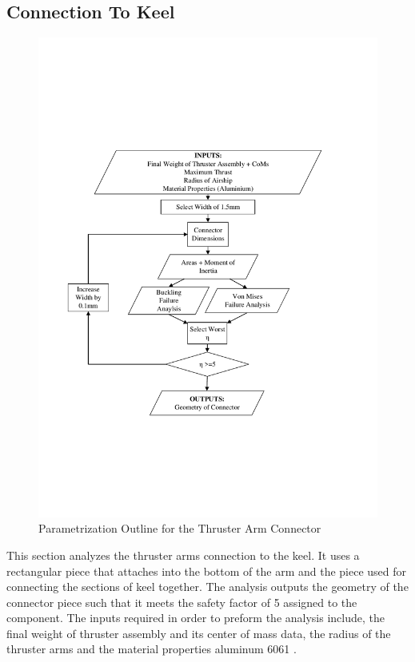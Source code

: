 \documentclass[../main.tex]{subfiles}
\begin{document}
\subsection{Connection To Keel} \label{connector}
\begin{figure}[H]
	\centering
	\includegraphics[width=.9\linewidth]{img/paramaterization/connector.pdf}
	\caption{Parametrization Outline for the Thruster Arm Connector}
	\label{fig:connectorParametrization}
\end{figure}

This section analyzes the thruster arms connection to the keel. It uses a rectangular piece that attaches into the bottom of the arm and the piece used for connecting the sections of keel together. The analysis outputs the geometry of the connector piece such that it meets the safety factor of 5 assigned to the component. The inputs required in order to preform the analysis include, the final weight of thruster assembly and its center of mass data, the radius of the thruster arms and the material properties aluminum 6061 \cite{AlProperties}. 
\end{document}
